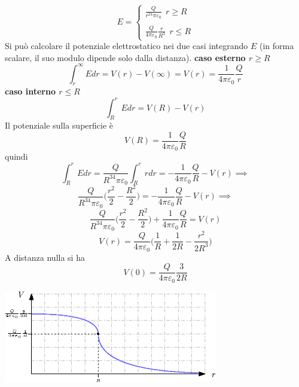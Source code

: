 \documentclass[10pt, letterpaper]{report}
\begin{document}
$$ E=\begin{cases}
   \displaystyle \frac{Q}{r^24\pi\varepsilon_0} \ \ r\ge R \\ \\
   \displaystyle  \frac{Q}{4\pi\varepsilon_0}\frac{r}{R^3}\ \ r\le R 
\end{cases}$$
Si può calcolare il potenziale elettrostatico nei due casi integrando $E$ (in forma scalare, il suo modulo dipende solo dalla distanza).\acc  
\textbf{caso esterno $r\ge R$} 
$$ \int_{r}^\infty E dr = V(r)-V(\infty)=V(r)=\frac{1}{4\pi\varepsilon_0}\frac{Q}{r}$$
\textbf{caso interno $r\le R$}
$$ \int_{R}^r E dr = V(R)-V(r)$$
Il potenziale sulla superficie è 
$$ V(R)=\frac{1}{4\pi\varepsilon_0}\frac{Q}{R}$$
quindi 
$$ \int_{R}^r E dr=\frac{Q}{R^34\pi\varepsilon_0}\int_{R}^r r dr = -\frac{1}{4\pi\varepsilon_0}\frac{Q}{R}-V(r) \implies $$
$$ \frac{Q}{R^34\pi\varepsilon_0}\Big( \frac{r^2}{2}-\frac{R^2}{2}\Big) = -\frac{1}{4\pi\varepsilon_0}\frac{Q}{R}-V(r) \implies $$
$$ \frac{Q}{R^34\pi\varepsilon_0}\Big( \frac{r^2}{2}-\frac{R^2}{2}\Big)  +\frac{1}{4\pi\varepsilon_0}\frac{Q}{R}=V(r) $$
$$ V(r)=\frac{Q}{4\pi\varepsilon_0}\Big( \frac{1}{R}+\frac{1}{2R}-\frac{r^2}{2R^3} \Big)$$
A distanza nulla si ha 
$$ V(0)=\frac{Q}{4\pi\varepsilon_0}\frac{3}{2R} $$
\begin{center}
    \includegraphics[width=0.7\textwidth]{images/potenzialeSfera.eps}
\end{center}\flowerLine 
\end{document}
